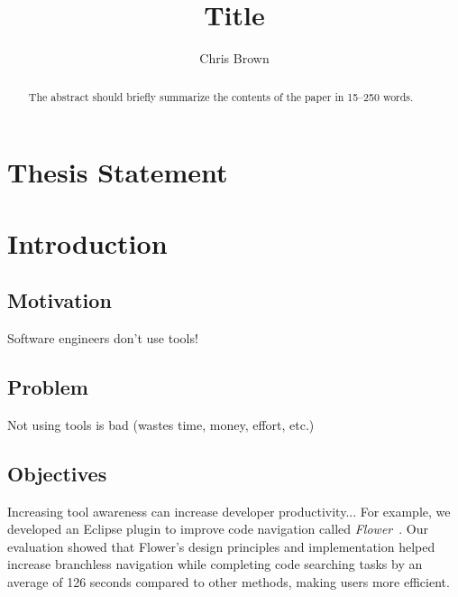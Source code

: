 \documentclass[runningheads]{llncs}
\begin{document}
%
\title{Title}
%
%
\author{Chris Brown}
%
%
%
\maketitle              %
%
\begin{abstract}
The abstract should briefly summarize the contents of the paper in
15--250 words.

\end{abstract}
\section{Thesis Statement}


\section{Introduction}

\subsection{Motivation}
Software engineers don't use tools!

\subsection{Problem}
Not using tools is bad (wastes time, money, effort, etc.) 

\subsection{Objectives}
Increasing tool awareness can increase developer productivity... For example, we developed an Eclipse plugin to improve code navigation called \textsl{Flower}~\cite{Flower}. Our evaluation showed that Flower's design principles and implementation helped increase branchless navigation while completing code searching tasks by an average of 126 seconds compared to other methods, making users more efficient.
\end{document}
